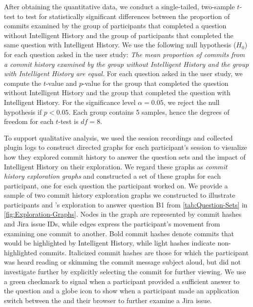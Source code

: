 After obtaining the quantitative data, we conduct a single-tailed, two-sample $t$-test to test for statistically significant differences 
between the proportion of commits examined by the group of participants that completed a question without Intelligent History and the group of participants 
that completed the same question with Intelligent History.
We use the following null hypothesis ($H_{0}$) for each question asked in the user study: 
\textit{The mean proportion of commits from a commit history examined by the group without Intelligent History and the group with Intelligent History are equal.}
For each question asked in the user study, we compute the $t$-value and $p$-value for the group that completed 
the question without Intelligent History and the group that completed the question with Intelligent History.
For the significance level $\alpha = 0.05$, we reject the null hypothesis if $p < 0.05$.
Each group contains 5 samples, hence the degrees of freedom for each $t$-test is $df = 8$.

To support qualitative analysis, we used the session recordings and collected plugin logs to construct directed graphs 
for each participant's session to visualize how they explored commit history to answer the question sets 
and the impact of Intelligent History on their exploration.
We regard these graphs as \emph{commit history exploration graphs} and constructed a set of these graphs for each participant, 
one for each question the participant worked on.
We provide a sample of two commit history exploration graphs we constructed to illustrate 
participants  and ’s exploration to answer question B1 
from \autoref{tab:Question-Sets} in \autoref{fig:Exploration-Graphs}.
Nodes in the graph are represented by commit hashes and Jira issue IDs, 
while edges express the participant's movement from examining one commit to another.
Bold commit hashes denote commits that would be highlighted by Intelligent History, 
while light hashes indicate non-highlighted commits.
Italicized commit hashes are those for which the participant was heard reading or skimming the commit message subject aloud, 
but did not investigate further by explicitly selecting the commit for further viewing.
We use a green checkmark to signal when a participant provided a sufficient answer to the question 
and a globe icon to show when a participant made an application switch between the  
and their browser to further examine a Jira issue.

